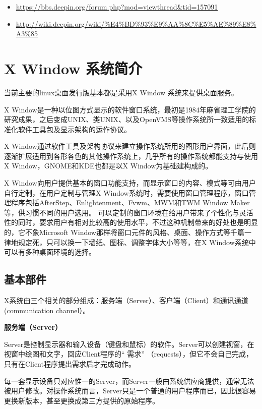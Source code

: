 \documentclass[doctor,openright,twoside]{sjtuthesis}
\providecommand{\tightlist}{%
    \setlength{\itemsep}{0pt}\setlength{\parskip}{0pt}}
\theoremstyle{plain}
\theoremstyle{definition}
\theoremstyle{remark}
\theoremstyle{ocrenumbox}
\theoremstyle{plain}
\begin{document}
\begin{itemize}
\tightlist
\item
  \url{https://bbs.deepin.org/forum.php?mod=viewthread\&tid=157091}
\item
  \url{http://wiki.deepin.org/wiki/\%E4\%BD\%93\%E9\%AA\%8C\%E5\%AE\%89\%E8\%A3\%85}
\end{itemize}

\hypertarget{x-window-}{%
\section{X Window 系统简介}\label{x-window-}}

当前主要的linux桌面发行版基本都是采用X Window 系统来提供桌面服务。

X Window是一种以位图方式显示的软件窗口系统，最初是1984年麻省理工学院的研究成果，之后变成UNIX、类UNIX、以及OpenVMS等操作系统所一致适用的标准化软件工具包及显示架构的运作协议。

X Window通过软件工具及架构协议来建立操作系统所用的图形用户界面，此后则逐渐扩展适用到各形各色的其他操作系统上，几乎所有的操作系统都能支持与使用X Window，GNOME和KDE也都是以X Window为基础建构成的。

X Window向用户提供基本的窗口功能支持，而显示窗口的内容、模式等可由用户自行定制，在用户定制与管理X Window系统时，需要使用窗口管理程序，窗口管理程序包括AfterStep、Enlightenment、Fvwm、MWM和TWM Window Maker等，供习惯不同的用户选用。
可以定制的窗口环境在给用户带来了个性化与灵活性的同时，要求用户有相对比较高的使用水平，不过这种机制带来的好处也是明显的，它不象Microsoft Window那样将窗口元件的风格、桌面、操作方式等千篇一律地规定死，只可以换一下墙纸、图标、调整字体大小等等，在X Window系统中可以有多种桌面环境的选择。

\hypertarget{section-8}{%
\subsection{基本部件}\label{section-8}}

X系统由三个相关的部分组成：服务端（Server）、客户端（Client）和通讯通道　(communication channel）。

\textbf{服务端（Server）}

Server是控制显示器和输入设备（键盘和鼠标）的软件。Server可以创建视窗，在视窗中绘图和文字，回应Client程序的`` 需求'' （requests），但它不会自己完成，只有在Client程序提出需求后才完成动作。

每一套显示设备只对应惟一的Server，而Server一般由系统供应商提供，通常无法被用户修改。对操作系统而言，Server只是一个普通的用户程序而已，因此很容易更换新版本，甚至更换成第三方提供的原始程序。
\end{document}
